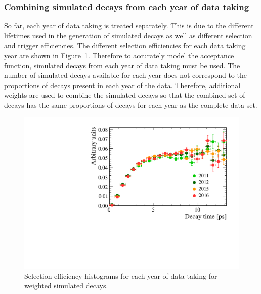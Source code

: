 \clearpage

\subsubsection*{Combining \boldmath{\bsmumu} simulated decays from each year of data taking}


So far, each year of data taking is treated separately. This is due to the different \bs lifetimes used in the generation of simulated decays as well as different selection and trigger efficiencies. The different selection efficiencies for each data taking year are shown in Figure~\ref{fig:accptplotyrs}. Therefore to accurately model the \bsmumu acceptance function, simulated decays from each year of data taking must be used. The number of simulated decays available for each year does not correspond to the proportions of decays present in each year of the data. Therefore, additional weights are used to combine the simulated decays so that the combined set of decays has the same proportions of decays for each year as the complete data set. 


\begin{figure}[btp]
    \centering
        \includegraphics[width= 0.8 \textwidth]{./Figs/LifetimeMeasurement/Acceptance_per_year.pdf}
    \caption{Selection efficiency histograms for each year of data taking for weighted simulated \bsmumu decays. }
    \label{fig:accptplotyrs}
\end{figure}


